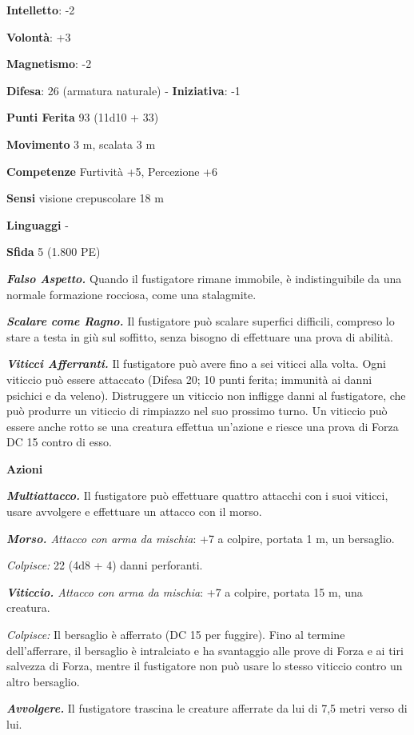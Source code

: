 \begin{multicols}{2}
\textbf{Intelletto}: -2

\textbf{Volontà}: +3

\textbf{Magnetismo}: -2

\textbf{Difesa}: 26 (armatura naturale) - \textbf{Iniziativa}: -1

\textbf{Punti Ferita} 93 (11d10 + 33)

\textbf{Movimento} 3 m, scalata 3 m

\textbf{Competenze} Furtività +5, Percezione +6

\textbf{Sensi} visione crepuscolare 18 m

\textbf{Linguaggi} -

\textbf{Sfida} 5 (1.800 PE)\smallskip

\emph{\textbf{Falso Aspetto.}} Quando il fustigatore rimane immobile, è
indistinguibile da una normale formazione rocciosa, come una stalagmite.

\emph{\textbf{Scalare come Ragno.}} Il fustigatore può scalare superfici
difficili, compreso lo stare a testa in giù sul soffitto, senza bisogno
di effettuare una prova di abilità.

\emph{\textbf{Viticci Afferranti.}} Il fustigatore può avere fino a sei
viticci alla volta. Ogni viticcio può essere attaccato (Difesa 20; 10 punti
ferita; immunità ai danni psichici e da veleno). Distruggere un viticcio
non infligge danni al fustigatore, che può produrre un viticcio di
rimpiazzo nel suo prossimo turno. Un viticcio può essere anche rotto se
una creatura effettua un'azione e riesce una prova di Forza DC 15 contro
di esso.

\smallskip\textbf{Azioni}

\emph{\textbf{Multiattacco.}} Il fustigatore può effettuare quattro
attacchi con i suoi viticci, usare avvolgere e effettuare un attacco con
il morso.

\emph{\textbf{Morso.} Attacco con arma da mischia}: +7 a colpire,
portata 1 m, un bersaglio.

\emph{Colpisce:} 22 (4d8 + 4) danni perforanti.

\emph{\textbf{Viticcio.} Attacco con arma da mischia}: +7 a colpire,
portata 15 m, una creatura.

\emph{Colpisce:} Il bersaglio è afferrato (DC 15 per fuggire). Fino al
termine dell'afferrare, il bersaglio è intralciato e ha svantaggio alle
prove di Forza e ai tiri salvezza di Forza, mentre il fustigatore non
può usare lo stesso viticcio contro un altro bersaglio.

\emph{\textbf{Avvolgere.}} Il fustigatore trascina le creature afferrate
da lui di 7,5 metri verso di lui.


\end{multicols}
